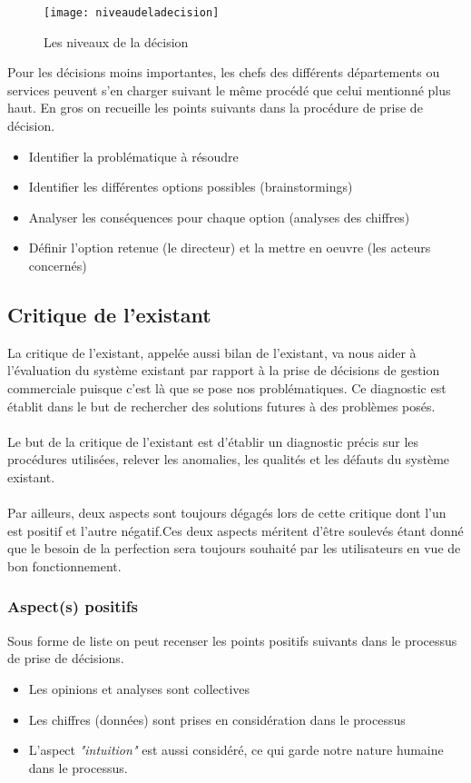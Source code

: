  \begin{figure}[H]
     \centering
     \texttt{[image: niveaudeladecision]}
     \caption{Les niveaux de la décision}
     \label{fig:niveaudeladecision}
 \end{figure}
 
 
 Pour les décisions moins importantes, les chefs des différents départements ou services peuvent s’en charger suivant le même procédé que celui mentionné plus haut. En gros on recueille les points suivants dans la procédure de prise de décision.
 \begin{itemize}
     \item Identifier la problématique à résoudre
     \item Identifier les différentes options possibles (brainstormings)
     \item Analyser les conséquences pour chaque option (analyses des chiffres)
     \item Définir l'option retenue (le directeur) et la mettre en oeuvre (les acteurs concernés)
 \end{itemize}
 
 \subsection{Critique de l’existant}
 La critique de l'existant, appelée aussi bilan de l'existant, va nous aider à l'évaluation du système existant par rapport à la prise de décisions de gestion commerciale puisque c'est là que se pose nos problématiques. Ce diagnostic est établit dans le but de rechercher des solutions futures à des problèmes posés.
 \paragraph{}
 Le but de la critique de l'existant est d'établir un diagnostic précis sur les procédures utilisées, relever les anomalies, les qualités et les défauts du système existant.
 \paragraph{}
 Par ailleurs, deux aspects sont toujours dégagés lors de cette critique dont l'un est positif et l'autre négatif.Ces deux aspects méritent d'être soulevés étant donné que le besoin de la perfection sera toujours souhaité par les utilisateurs en vue de bon fonctionnement.
 
 \subsubsection{Aspect(s) positifs}
 Sous forme de liste on peut recenser les points positifs suivants dans le processus de prise de décisions.
 \begin{itemize}
     \item Les opinions et analyses sont collectives
     \item Les chiffres (données) sont prises en considération dans le processus
     \item L'aspect \textit{"intuition"} est aussi considéré, ce qui garde notre nature humaine dans le processus.
 \end{itemize}
 

